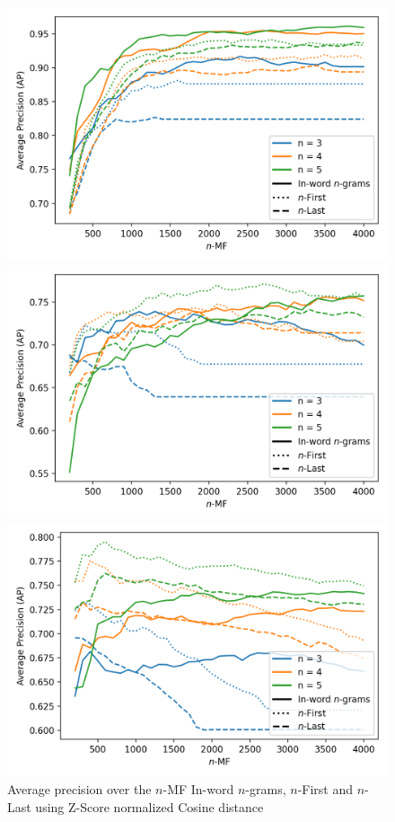 \begin{figure}[!t]
  \centering
  \caption{Average precision over the $n$-MF In-word $n$-grams, $n$-First and $n$-Last using Z-Score normalized Cosine distance}
  \label{fig:first_last_letters_ngrams}

  \label{fig:first_last_letters_ngrams_oxquarry}
  \includegraphics[width=\linewidth]{img/first_last_letters_ngrams_oxquarry.png}

  \vspace{0.5cm}

  \label{fig:first_last_letters_ngrams_brunet}
  \includegraphics[width=\linewidth]{img/first_last_letters_ngrams_brunet.png}

  \vspace{0.5cm}

  \label{fig:first_last_letters_ngrams_st_jean}
  \includegraphics[width=\linewidth]{img/first_last_letters_ngrams_st_jean.png}
\end{figure}
